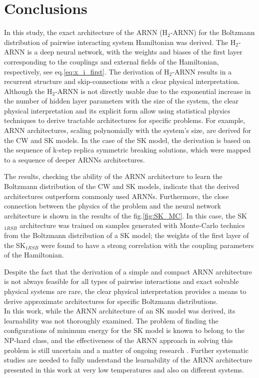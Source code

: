 \documentclass[aps,physrev,10pt,floatfix,reprint]{revtex4-2}
\begin{document}
\section{Conclusions}
In this study, the exact architecture of the ARNN (H$_2$-ARNN) for the Boltzmann distribution of pairwise interacting system Hamiltonian was derived. The H$_2$-ARNN is a deep neural network, with the weights and biases of the first layer corresponding to the couplings and external fields of the Hamiltonian, respectively, see eq.\ref{eq:x_i_first}. The derivation of H$_2$-ARNN results in a recurrent structure and skip-connections with a clear physical interpretation. Although the H$_2$-ARNN is not directly usable due to the exponential increase in the number of hidden layer parameters with the size of the system, the clear physical interpretation and its explicit form allow using statistical physics techniques to derive tractable architectures for specific problems. For example, ARNN architectures, scaling polynomially with the system's size, are derived for the CW and SK models. In the case of the SK model, the derivation is based on the sequence of k-step replica symmetric breaking solutions, which were mapped to a sequence of deeper ARNNs architectures.

The results, checking the ability of the ARNN architecture to learn the Boltzmann distribution of the CW and SK models, indicate that the derived architectures outperform commonly used ARNNs. Furthermore, the close connection between the physics of the problem and the neural network architecture is shown in the results of the fig.\ref{fig:SK_MC}. In this case, the  SK$_{1RSB}$ architecture was trained on samples generated with Monte-Carlo technics from the Boltzmann distribution of a SK model; the weights of the first layer of the SK$_{1RSB}$ were found to have a strong correlation with the coupling parameters of the Hamiltonian.

Despite the fact that the derivation of a simple and compact ARNN architecture is not always feasible for all types of pairwise interactions and exact solvable physical systems are rare, the clear physical interpretation provides a means to derive approximate architectures for specific Boltzmann distributions. \\
In this work, while the ARNN architecture of an SK model was derived, its learnability was not thoroughly examined. The problem of finding the configurations of minimum energy for the SK model is known to belong to the NP-hard class, and the effectiveness of the ARNN approach in solving this problem is still uncertain and a matter of ongoing research \cite{https://doi.org/10.48550/arxiv.2210.11145, 10.1038/s42256-021-00401-3, condmat7020038}. Further systematic studies are needed to fully understand the learnability of the ARNN architecture presented in this work at very low temperatures and also on different systems.\\
\end{document}
